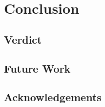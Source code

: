 %
\chapter{Conclusion}
\label{sec:conclusion}

\section{Verdict}
\label{sec:conclusion:verdict}

\section{Future Work}
\label{sec:conclusion:future-work}

\section{Acknowledgements}
\label{sec:conclusion:acknowledgement}

